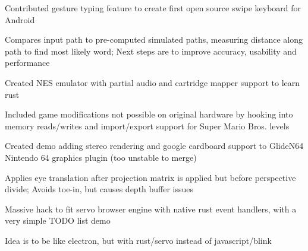 \documentclass[12pt]{jmichaud-resume}
\begin{document}
\begin{minipage}[t]{0.64\textwidth}
 \hfill {}

\sectionsep

 \hfill {}

\sectionsep

 \hfill
{}
\begin{tightemize}
	\item Contributed gesture typing feature to create first open source swipe keyboard for Android
	\item Compares input path to pre-computed simulated paths, measuring distance along path to find most likely word; Next steps are to improve accuracy, usability and performance
\end{tightemize}

\sectionsep

 \hfill
{}
\begin{tightemize}
	\item Created NES emulator with partial audio and cartridge mapper support to learn rust
	\item Included game modifications not possible on original hardware by hooking into memory reads/writes and import/export support for Super Mario Bros. levels
\end{tightemize}

\sectionsep
{} \hfill
{}
\begin{tightemize}
	\item Created demo adding stereo rendering and google cardboard support to GlideN64 Nintendo 64 graphics plugin (too unstable to merge)
	\item Applies eye translation after projection matrix is applied but before perspective divide; Avoids toe-in, but causes depth buffer issues
\end{tightemize}
\sectionsep

\iftrue
{} \hfill
{}
\begin{tightemize}
	\item Massive hack to fit servo browser engine with native rust event handlers, with a very simple TODO list demo
	\item Idea is to be like electron, but with rust/servo instead of javascript/blink
\end{tightemize}
\sectionsep
\fi

\end{minipage}
\end{document}
